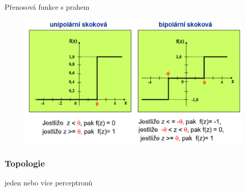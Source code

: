 Přenosová funkce s prahem
\begin{figure}[H]
    \includegraphics[scale = 0.3]{images/perceptron_prenos_s_prahem.png}
\end{figure}

\subsubsection*{Topologie}
jeden nebo více perceptronů
\newpage

